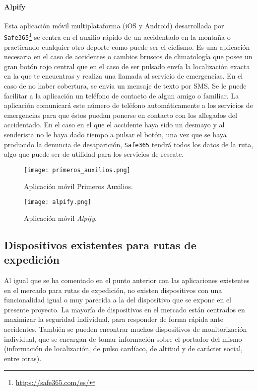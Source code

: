 \paragraph{Alpify}

Esta aplicación móvil multiplataforma (iOS y Android) desarrollada por \texttt{Safe365}\footnote{\url{https://safe365.com/es/}} se centra en el auxilio rápido de un accidentado en la montaña o practicando cualquier otro deporte como puede ser el ciclismo. Es una aplicación necesaria en el caso de accidentes o cambios bruscos de climatología que posee un gran botón rojo central que en el caso de ser pulsado envía la localización exacta en la que te encuentras y realiza una llamada al servicio de emergencias. En el caso de no haber cobertura, se envía un mensaje de texto por \ac{SMS}. Se le puede facilitar a la aplicación un teléfono de contacto de algun amigo o familiar. La aplicación comunicará este número de teléfono automáticamente a los servicios de emergencias para que éstos puedan ponerse en contacto con los allegados del accidentado. En el caso en el que el accidente haya sido un desmayo y al senderista no le haya dado tiempo a pulsar el botón, una vez que se haya producido la denuncia de desaparición, \texttt{Safe365} tendrá todos los datos de la ruta, algo que puede ser de utilidad para los servicios de rescate.

\begin{figure}[!htb]
\begin{minipage}{0.48\textwidth}
\centering
\texttt{[image: primeros\_auxilios.png]}
\caption{Aplicación móvil Primeros Auxilios. \protect\footnotemark}
\label{fig:primeros_auxilios}
\end{minipage}\hfill
\begin{minipage}{0.48\textwidth}
\centering
\texttt{[image: alpify.png]}
\caption{Aplicación móvil \textit{Alpify}.}
\label{fig:alpify}
\end{minipage}
\end{figure}


\subsection{Dispositivos existentes para rutas de expedición}

Al igual que se ha comentado en el punto anterior con las aplicaciones existentes en el mercado para rutas de expedición, no existen dispositivos con una funcionalidad igual o muy parecida a la del dispositivo que se expone en el presente proyecto. La mayoría de dispositivos en el mercado están centrados en maximizar la seguridad individual, para responder de forma rápida ante accidentes. También se pueden encontrar muchos dispositivos de monitorización individual, que se encargan de tomar información sobre el portador del mismo (información de localización, de pulso cardíaco, de altitud y de carácter social, entre otras). 

